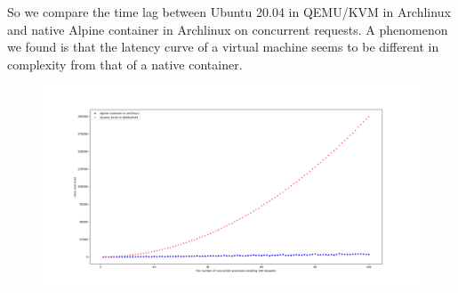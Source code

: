 So we compare the time lag between Ubuntu 20.04 in QEMU/KVM in Archlinux
and native Alpine container in Archlinux on concurrent requests.
A phenomenon we found is that the latency curve of a virtual
machine seems to be different in complexity from that of a native container.

\begin{figure}
    \centering
    \includegraphics[width=\textwidth]{src/concurrent.png}
    \label{conc}
\end{figure}
